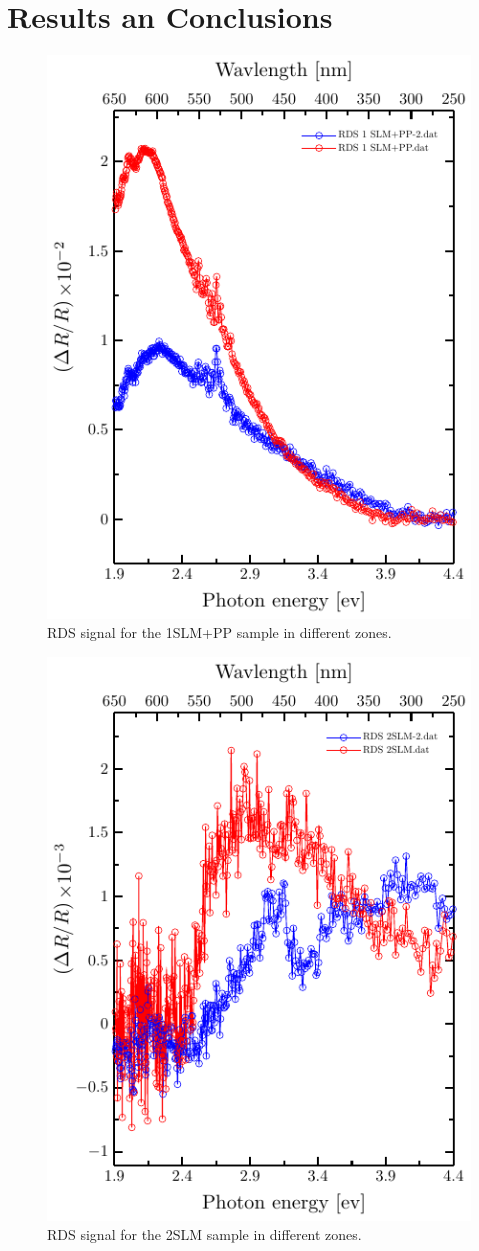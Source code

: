 \section{Results an Conclusions}



\begin{figure}
	\centering
	\includegraphics[width=0.5\linewidth]{FIGURES/Anexo-CuSn/RDS1SLM+PP-2}
	\caption{RDS signal for the 1SLM+PP sample in different zones.}
	\label{fig:rds-1-slmpp-2}
\end{figure}

\begin{figure}
	\centering
	\includegraphics[width=0.5\linewidth]{FIGURES/Anexo-CuSn/RDS2SLM-2}
	\caption{RDS signal for the 2SLM sample in different zones. }
	\label{fig:rds-1-slmpp-2}
\end{figure}

